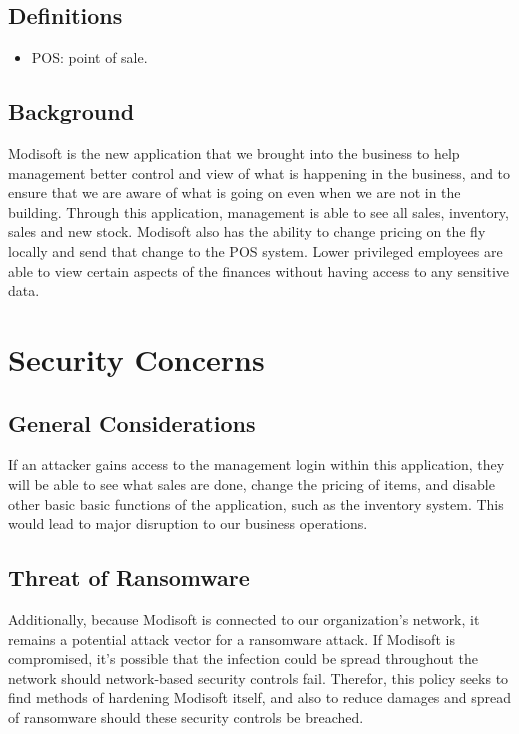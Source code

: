 \documentclass[11pt]{article}
\begin{document}
\subsection{Definitions}
\label{sec:orga46fc7f}
\begin{itemize}
\item POS: point of sale.
\end{itemize}

\subsection{Background}
\label{sec:org255932f}
Modisoft is the new application that we brought into the business to help management better control and view of what is happening in the business, and to ensure that we are aware of what is going on even when we are not in the building. Through this application, management is able to see all sales, inventory, sales and new stock. Modisoft also has the ability to change pricing on the fly locally and send that change to the POS system. Lower privileged employees are able to view certain aspects of the finances without having access to any sensitive data.

\section{Security Concerns}
\label{sec:orgd4846e4}
\subsection{General Considerations}
\label{sec:org9e8ebe4}
If an attacker gains access to the management login within this application, they will be able to see what sales are done, change the pricing of items, and disable other basic basic functions of the application, such as the inventory system. This would lead to major disruption to our business operations.

\subsection{Threat of Ransomware}
\label{sec:org21e22ec}
Additionally, because Modisoft is connected to our organization's network, it remains a potential attack vector for a ransomware attack. If Modisoft is compromised, it's possible that the infection could be spread throughout the network should network-based security controls fail. Therefor, this policy seeks to find methods of hardening Modisoft itself, and also to reduce damages and spread of ransomware should these security controls be breached.
\end{document}
